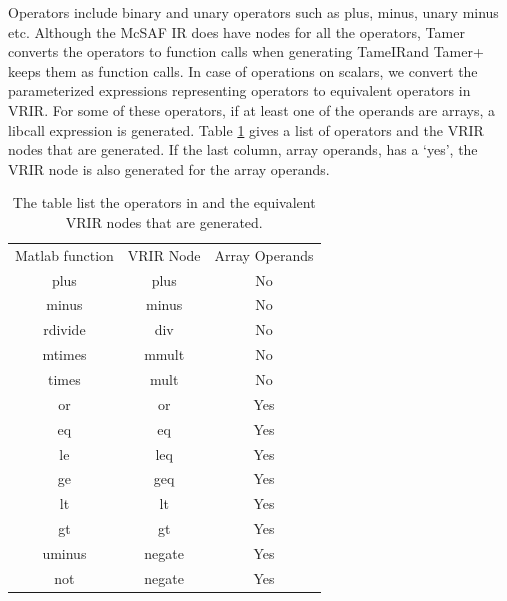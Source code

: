 Operators include binary and unary operators such as plus, minus, unary minus etc. Although the McSAF IR does have nodes for all the operators, Tamer converts the operators to function calls when generating TameIRand Tamer+ keeps them as function calls. In case of operations on scalars, we convert the parameterized expressions representing operators to equivalent operators in VRIR. For some of these operators, if at least one of the operands are arrays, a libcall expression is generated. Table \ref{tab:opGen} gives a list of \matlab operators  and the VRIR nodes that are generated. If the last column, array operands, has a `yes', the VRIR node is also generated for the array operands. 
\begin{table}[htbp]
\centering
\begin{tabular}{|c|c|c|}
\hline
Matlab function & VRIR Node & Array Operands \\ \hhline{|=|=|=|}
plus            & plus   & No   \\ \hline
minus           & minus  & No   \\ \hline
rdivide         & div    & No   \\ \hline
mtimes          & mmult  & No   \\ \hline
times           & mult   & No   \\ \hline
or              & or     & Yes   \\ \hline
eq              & eq     & Yes   \\ \hline
le              & leq    & Yes   \\ \hline
ge              & geq    & Yes   \\ \hline
lt              & lt     & Yes   \\ \hline
gt              & gt     & Yes   \\ \hline
uminus          & negate & Yes   \\ \hline
not             & negate & Yes   \\ \hline
\end{tabular}
\caption[List of operators in \matlab and their equivalent VRIR nodes]{ The table list the operators in \matlab and the equivalent VRIR nodes that are generated. }
\label{tab:opGen}
\end{table}

